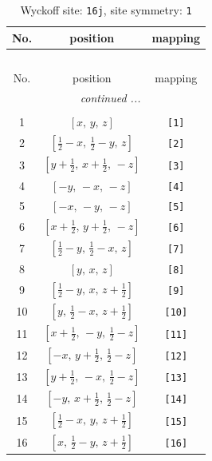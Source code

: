 \documentclass[fleqn,8pt]{jsarticle}
\begin{document}
\begin{longtable}{ccc}
\caption{Wyckoff site: {\tt 16j}, site symmetry: {\tt 1}}
 \\
 \hline \hline
No. & position & mapping \\ \hline \endfirsthead

\multicolumn{2}{l}{\tablename\ \thetable{}} \\
 \hline \hline
No. & position & mapping \\ \hline \endhead

 \hline \hline
\multicolumn{2}{r}{\footnotesize\it continued ...} \\ \endfoot

 \hline \hline
\multicolumn{2}{r}{} \\ \endlastfoot

1 & $\left[ x,\, y,\, z \right]$ & {\tt [1]} \\ \hline
2 & $\left[ \frac{1}{2} - x,\, \frac{1}{2} - y,\, z \right]$ & {\tt [2]} \\ \hline
3 & $\left[ y + \frac{1}{2},\, x + \frac{1}{2},\, - z \right]$ & {\tt [3]} \\ \hline
4 & $\left[ - y,\, - x,\, - z \right]$ & {\tt [4]} \\ \hline
5 & $\left[ - x,\, - y,\, - z \right]$ & {\tt [5]} \\ \hline
6 & $\left[ x + \frac{1}{2},\, y + \frac{1}{2},\, - z \right]$ & {\tt [6]} \\ \hline
7 & $\left[ \frac{1}{2} - y,\, \frac{1}{2} - x,\, z \right]$ & {\tt [7]} \\ \hline
8 & $\left[ y,\, x,\, z \right]$ & {\tt [8]} \\ \hline
9 & $\left[ \frac{1}{2} - y,\, x,\, z + \frac{1}{2} \right]$ & {\tt [9]} \\ \hline
10 & $\left[ y,\, \frac{1}{2} - x,\, z + \frac{1}{2} \right]$ & {\tt [10]} \\ \hline
11 & $\left[ x + \frac{1}{2},\, - y,\, \frac{1}{2} - z \right]$ & {\tt [11]} \\ \hline
12 & $\left[ - x,\, y + \frac{1}{2},\, \frac{1}{2} - z \right]$ & {\tt [12]} \\ \hline
13 & $\left[ y + \frac{1}{2},\, - x,\, \frac{1}{2} - z \right]$ & {\tt [13]} \\ \hline
14 & $\left[ - y,\, x + \frac{1}{2},\, \frac{1}{2} - z \right]$ & {\tt [14]} \\ \hline
15 & $\left[ \frac{1}{2} - x,\, y,\, z + \frac{1}{2} \right]$ & {\tt [15]} \\ \hline
16 & $\left[ x,\, \frac{1}{2} - y,\, z + \frac{1}{2} \right]$ & {\tt [16]} \\
\end{longtable}
\end{document}
